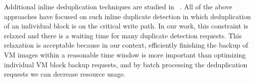 Additional inline deduplication techniques are studied in ~\cite{sparseindex09,Guo2011,idedup}. 
All of the above approaches have focused on
such inline duplicate detection in which  deduplication of an individual block  is on the critical write path.
In our work, this constraint is relaxed and 
there is a waiting time for many duplicate detection requests. This relaxation is acceptable because 
in our context, efficiently finishing the backup of VM images within a reasonable time window is more
important than optimizing individual VM block  backup requests, and by batch
processing the deduplication requests we can decrease resource usage.




  
